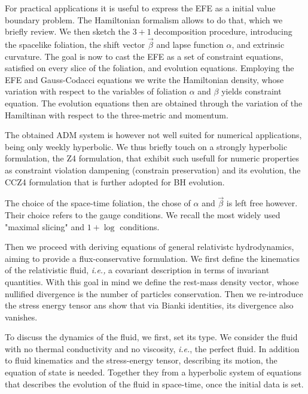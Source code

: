 For practical applications it is useful to express the EFE as a initial value boundary problem. 
The Hamiltonian formalism allows to do that, which we briefly review. We then sketch the $3+1$ decomposition procedure, introducing the spacelike foliation, the shift vector $\vec{\beta}$ and lapse function $\alpha$, and extrinsic curvature.
The goal is now to cast the EFE as a set of constraint equations, satisfied on every slice of the foliation, and evolution equations.
Employing the EFE and Gauss-Codacci equations we write the Hamiltonian density, whose variation with respect to the variables of foliation $\alpha$ and $\beta$ yields constraint equation. 
The evolution equations then are obtained through the variation of the Hamiltinan with respect to the three-metric and momentum.

The obtained ADM system is however not well suited for numerical applications, being only weekly hyperbolic. 
We thus briefly touch on a strongly hyperbolic formulation, the Z4 formulation, that exhibit such usefull for numeric properties as constraint violation dampening (constrain preservation) and its evolution, the CCZ4 formulation that is further adopted for BH evolution. 

The choice of the space-time foliation, the chose of $\alpha$ and $\vec{\beta}$ is left free however. 
Their choice refers to the gauge conditions. 
We recall the most widely used "maximal slicing" and $1+\log$ conditions.



Then we proceed with deriving equations of general relativistc hydrodynamics, aiming to provide a flux-conservative formulation. 
We first define the kinematics of the relativistic fluid, \textit{i.e.,} a covariant description in terms of invariant quantities. 
With this goal in mind we define the rest-mass density vector, whose nullified divergence is the number of particles conservation. 
Then we re-introduce the stress energy tensor ans show that via Bianki identities, its divergence also vanishes.

To discuss the dynamics of the fluid, we first, set its type. 
We consider the fluid with no thermal conductivity and no viscosity, \textit{i.e.}, the perfect fluid. 
In addition to fluid kinematics and the stress-energy tensor, describing its motion, the equation of state is needed. 
Together they from a hyperbolic system of equations that describes the evolution of the fluid in space-time, once the initial data is set.

